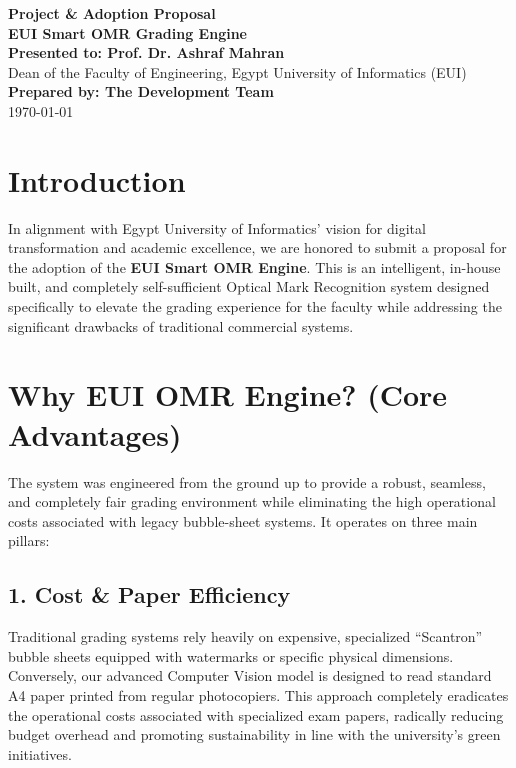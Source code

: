 \documentclass[12pt, a4paper]{article}
\begin{document}
\begin{center}
    \vspace*{2cm}
    {\Huge \textbf{Project \& Adoption Proposal}}\\[0.5cm]
    {\LARGE \textbf{EUI Smart OMR Grading Engine}}\\[2cm]
    
    {\Large \textbf{Presented to: Prof. Dr. Ashraf Mahran}}\\
    {\large Dean of the Faculty of Engineering, Egypt University of Informatics (EUI)}\\[3cm]

    {\large \textbf{Prepared by: The Development Team}}\\
    \vspace{1cm}
    {\today}
\end{center}

\newpage

\section*{Introduction}
In alignment with Egypt University of Informatics' vision for digital transformation and academic excellence, we are honored to submit a proposal for the adoption of the \textbf{EUI Smart OMR Engine}. This is an intelligent, in-house built, and completely self-sufficient Optical Mark Recognition system designed specifically to elevate the grading experience for the faculty while addressing the significant drawbacks of traditional commercial systems.

\section*{Why EUI OMR Engine? (Core Advantages)}
The system was engineered from the ground up to provide a robust, seamless, and completely fair grading environment while eliminating the high operational costs associated with legacy bubble-sheet systems. It operates on three main pillars:

\subsection*{1. Cost \& Paper Efficiency}
Traditional grading systems rely heavily on expensive, specialized ``Scantron'' bubble sheets equipped with watermarks or specific physical dimensions. 
Conversely, our advanced Computer Vision model is designed to read standard A4 paper printed from regular photocopiers. This approach completely eradicates the operational costs associated with specialized exam papers, radically reducing budget overhead and promoting sustainability in line with the university's green initiatives.
\end{document}
